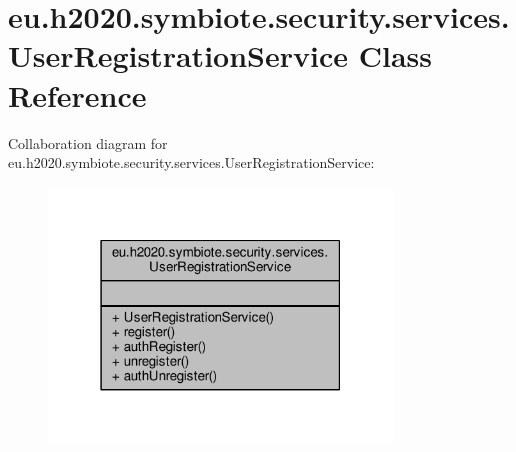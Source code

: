 \hypertarget{classeu_1_1h2020_1_1symbiote_1_1security_1_1services_1_1UserRegistrationService}{}\section{eu.\+h2020.\+symbiote.\+security.\+services.\+User\+Registration\+Service Class Reference}
\label{classeu_1_1h2020_1_1symbiote_1_1security_1_1services_1_1UserRegistrationService}


Collaboration diagram for eu.\+h2020.\+symbiote.\+security.\+services.\+User\+Registration\+Service\+:
\nopagebreak
\begin{figure}[H]
\begin{center}
\leavevmode
\includegraphics[width=259pt]{classeu_1_1h2020_1_1symbiote_1_1security_1_1services_1_1UserRegistrationService__coll__graph}
\end{center}
\end{figure}
